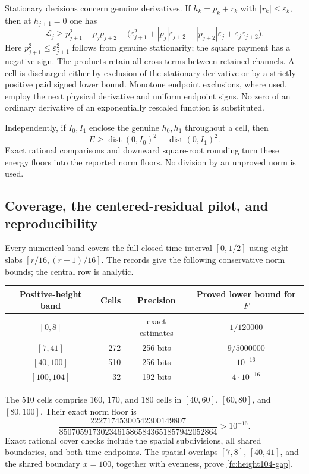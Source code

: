 \documentclass[11pt]{article}
\numberwithin{equation}{section}
\theoremstyle{definition}
\theoremstyle{remark}
\begin{document}
Stationary decisions concern genuine derivatives.  If
$h_k=p_k+r_k$ with $|r_k|\le\varepsilon_k$, then at $h_{j+1}=0$
one has
\begin{equation}
 \mathcal L_j\ge p_{j+1}^2-p_jp_{j+2}
 -\bigl(\varepsilon_{j+1}^2+|p_j|\varepsilon_{j+2}
       +|p_{j+2}|\varepsilon_j+\varepsilon_j\varepsilon_{j+2}\bigr).
 \label{fc:stationary-payment}
\end{equation}
Here $p_{j+1}^2\le\varepsilon_{j+1}^2$ follows from genuine
stationarity; the square payment has a negative sign.
The products retain all cross terms between retained channels.
A cell is discharged either by exclusion of the stationary derivative
or by a strictly positive paid signed lower bound.
Monotone endpoint exclusions, where used, employ the next physical
derivative and uniform endpoint signs.  No zero of an ordinary
derivative of an exponentially rescaled function is substituted.

Independently, if $I_0,I_1$ enclose the genuine $h_0,h_1$ throughout
a cell, then
\begin{equation}
 E\ge \operatorname{dist}(0,I_0)^2+\operatorname{dist}(0,I_1)^2.
 \label{fc:interval-norm}
\end{equation}
Exact rational comparisons and downward square-root rounding turn
these energy floors into the reported norm floors.  No division by
an unproved norm is used.

\subsection{Coverage, the centered-residual pilot, and reproducibility}

Every numerical band covers the full closed time interval $[0,1/2]$
using eight slabs $[r/16,(r+1)/16]$.  The records give the following
conservative norm bounds; the central row is analytic.
\begin{center}
\begin{tabular}{c r c c}
Positive-height band&Cells&Precision&Proved lower bound for $|F|$\\ \hline
$[0,8]$&---&exact estimates&$1/120000$\\
$[7,41]$&272&256 bits&$9/5000000$\\
$[40,100]$&510&256 bits&$10^{-16}$\\
$[100,104]$&32&192 bits&$4\cdot10^{-16}$
\end{tabular}
\end{center}
The 510 cells comprise 160, 170, and 180 cells in $[40,60]$,
$[60,80]$, and $[80,100]$.  Their exact norm floor is
\[
 \frac{22271745300542300149807}
 {85070591730234615865843651857942052864}>10^{-16}.
\]
Exact rational cover checks include the spatial subdivisions,
all shared boundaries, and both time endpoints.  The spatial overlaps
$[7,8]$, $[40,41]$, and the shared boundary $x=100$, together with
evenness, prove \eqref{fc:height104-gap}.
\end{document}
